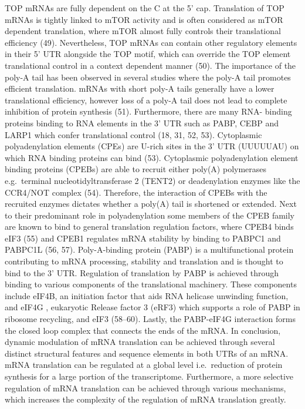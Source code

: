 \documentclass[12pt,openany]{book}
\begin{document}
TOP mRNAs are fully dependent on the C at the 5' cap. Translation of TOP
mRNAs is tightly linked to mTOR activity and is often considered as mTOR
dependent translation, where mTOR almost fully controls their
translational efficiency (49). Nevertheless, TOP mRNAs can contain other
regulatory elements in their 5' UTR alongside the TOP motif, which can
override the TOP element translational control in a context dependent
manner (50). The importance of the poly-A tail has been observed in
several studies where the poly-A tail promotes efficient translation.
mRNAs with short poly-A tails generally have a lower translational
efficiency, however loss of a poly-A tail does not lead to complete
inhibition of protein synthesis (51). Furthermore, there are many RNA-
binding proteins binding to RNA elements in the 3' UTR such as PABP,
CEBP and LARP1 which confer translational control (18, 31, 52, 53).
Cytoplasmic polyadenylation elements (CPEs) are U-rich sites in the 3'
UTR (UUUUUAU) on which RNA binding proteins can bind (53). Cytoplasmic
polyadenylation element binding proteins (CPEBs) are able to recruit
either poly(A) polymerases e.g.~terminal nucleotidyltransferase 2
(TENT2) or deadenylation enzymes like the CCR4/NOT complex (54).
Therefore, the interaction of CPEBs with the recruited enzymes dictates
whether a poly(A) tail is shortened or extended. Next to their
predominant role in polyadenylation some members of the CPEB family are
known to bind to general translation regulation factors, where CPEB4
binds eIF3 (55) and CPEB1 regulates mRNA stability by binding to PABPC1
and PABPC1L (56, 57). Poly-A-binding protein (PABP) is a multifunctional
protein contributing to mRNA processing, stability and translation and
is thought to bind to the 3' UTR. Regulation of translation by PABP is
achieved through binding to various components of the translational
machinery. These components include eIF4B, an initiation factor that
aids RNA helicase unwinding function, and eIF4G , eukaryotic Release
factor 3 (eRF3) which supports a role of PABP in ribosome recycling, and
eIF3 (58--60). Lastly, the PABP-eIF4G interaction forms the closed loop
complex that connects the ends of the mRNA. In conclusion, dynamic
modulation of mRNA translation can be achieved through several distinct
structural features and sequence elements in both UTRs of an mRNA. mRNA
translation can be regulated at a global level i.e.~reduction of protein
synthesis for a large portion of the transcriptome. Furthermore, a more
selective regulation of mRNA translation can be achieved through various
mechanisms, which increases the complexity of the regulation of mRNA
translation greatly.
\end{document}
